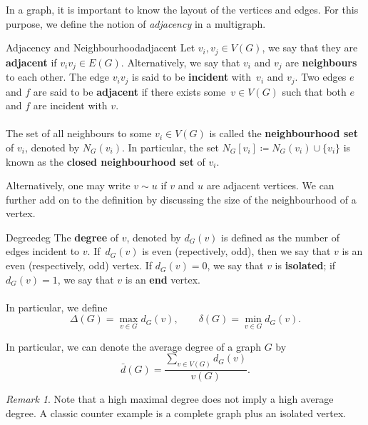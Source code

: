 \documentclass[math, code]{amznotes}
\theoremstyle{remark}
\newtheorem*{remark}{Remark}
\begin{document}
In a graph, it is important to know the layout of the vertices and edges. For this purpose, we define the notion of \textit{adjacency} in a multigraph.
\begin{dfnbox}{Adjacency and Neighbourhood}{adjacent}
    Let $v_i, v_j \in V(G)$, we say that they are {\color{red} \textbf{adjacent}} if $v_iv_j \in E(G)$. Alternatively, we say that $v_i$ and $v_j$ are {\color{red} \textbf{neighbours}} to each other. The edge $v_iv_j$ is said to be {\color{red} \textbf{incident}} with~$v_i$ and $v_j$. Two edges $e$ and $f$ are said to be {\color{red} \textbf{adjacent}} if there exists some~$v \in V(G)$ such that both $e$ and $f$ are incident with $v$. 
    \\\\
    The set of all neighbours to some $v_i \in V(G)$ is called the {\color{red} \textbf{neighbourhood set}} of $v_i$, denoted by $N_G(v_i)$. In particular, the set $N_G[v_i] \coloneqq N_G(v_i)\cup\{v_i\}$ is known as the {\color{red} \textbf{closed neighbourhood set}} of $v_i$.
\end{dfnbox}
Alternatively, one may write $v \sim u$ if $v$ and $u$ are adjacent vertices. We can further add on to the definition by discussing the size of the neighbourhood of a vertex.
\begin{dfnbox}{Degree}{deg}
    The {\color{red} \textbf{degree}} of $v$, denoted by $d_G(v)$ is defined as the number of edges incident to $v$. If~$d_G(v)$ is even (repectively, odd), then we say that $v$ is an even (respectively, odd) vertex. If $d_G(v) = 0$, we say that $v$ is {\color{red} \textbf{isolated}}; if $d_G(v) = 1$, we say that $v$ is an {\color{red} \textbf{end}} vertex. 
    \\\\
    In particular, we define
    \begin{equation*}
        \Delta(G) = \max_{v \in G}d_G(v), \qquad \delta(G) = \min_{v \in G}d_G(v).
    \end{equation*}
\end{dfnbox}
In particular, we can denote the average degree of a graph $G$ by
\begin{equation*}
    \bar{d}(G) = \frac{\sum_{v \in V(G)}d_G(v)}{v(G)}.
\end{equation*}
\begin{notebox}
    \begin{remark}
        Note that a high maximal degree does not imply a high average degree. A classic counter example is a complete graph plus an isolated vertex.
    \end{remark}
\end{notebox}
\end{document}
